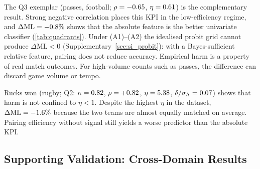 The Q3 exemplar (passes, football; $\rho=-0.65$, $\eta=0.61$) is the complementary result. Strong negative correlation places this KPI in the low-efficiency regime, and $\Delta\mathrm{ML}=-0.8\%$ shows that the absolute feature is the better univariate classifier (\cref{tab:quadrants}). Under (A1)--(A2) the idealised probit grid cannot produce $\Delta\mathrm{ML}<0$ (Supplementary~\cref{sec:si_probit}): with a Bayes-sufficient relative feature, pairing does not reduce accuracy. Empirical harm is a property of real match outcomes. For high-volume counts such as passes, the difference can discard game volume or tempo.

Rucks won (rugby; Q2: $\kappa=0.82$, $\rho=+0.82$, $\eta=5.38$, $\delta/\sigma_{\mathrm{A}}=0.07$) shows that harm is not confined to $\eta<1$. Despite the highest $\eta$ in the dataset, $\Delta\mathrm{ML}=-1.6\%$ because the two teams are almost equally matched on average. Pairing efficiency without signal still yields a worse predictor than the absolute KPI.

\subsection{Supporting Validation: Cross-Domain Results}

